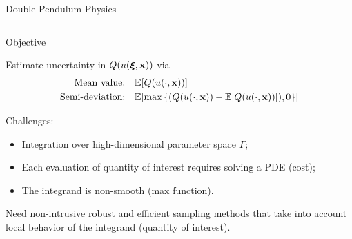 \documentclass[final]{beamer}
\newcommand{\E}{\ensuremath{\mathbb{E}} } %
\newcommand {\bxi} {\mbox{\boldmath $\xi$}}%
\newcommand{\bx}{\ensuremath{\mathbf{x}}} %
\begin{document}
\begin{frame}{}
{\begin{columns}[t]
\begin{column}{.30\linewidth}
\begin{block}{\centering Double Pendulum Physics}
\begin{columns}[T]
\end{columns}

\end{block}

                
                

\begin{block}{\centering Objective}

Estimate uncertainty in $Q(u(\bxi,\bx))$ via
\begin{align*}
\centering \text{Mean value: } \;\; &\E[Q(u(\cdot,\bx))] \\
\centering \text{Semi-deviation: } \;\; &\E[\max{\{(Q(u(\cdot,\bx)) - \E[Q(u(\cdot,\bx))]),0\}}]
\end{align*}

\vspace{0.5em}



Challenges:
\begin{itemize}
\item Integration over high-dimensional parameter space $\Gamma$;
\item Each evaluation of quantity of interest requires solving a PDE (cost);
\item The integrand is non-smooth (max function).
\end{itemize}

\vspace{0.5em}
Need non-intrusive robust and efficient sampling methods that take into account local behavior of the integrand (quantity of interest).
\end{block}


                        


\end{column}
\end{columns}}
\end{frame}
\end{document}
